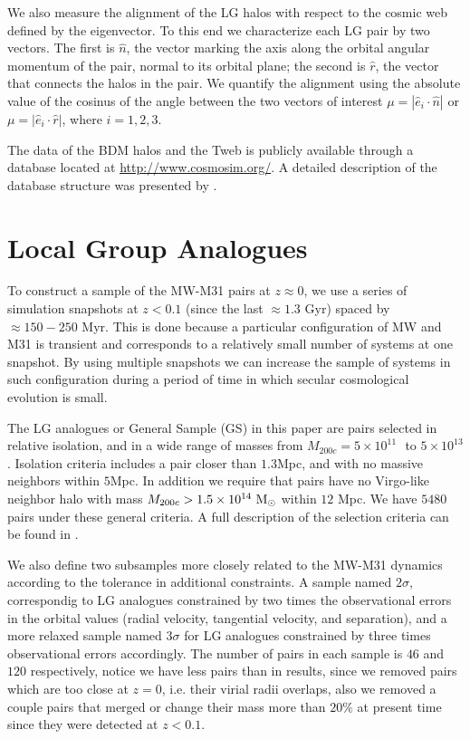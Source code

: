 \documentclass{emulateapj}
\newcommand{\mpc}{\rm{Mpc}}
\newcommand{\msun}{{\ifmmode{{\rm {M_{\odot}}}}\else{${\rm{M_{\odot}}}$}\fi}}
\begin{document}
We also measure the alignment of the LG halos with respect to the
cosmic web defined by the eigenvector.
To this end we characterize each LG pair by two vectors. 
The first is $\hat{n}$, the vector marking the axis along the orbital angular
momentum of the pair, normal to its orbital plane; the second is
$\hat{r}$, the vector that connects the halos in the pair. 
We quantify the alignment using the absolute value of the cosinus of
the angle between the two vectors of interest $\mu=|\hat{e}_i \cdot
\hat{n}|$ or $\mu=|\hat{e}_i\cdot \hat{r}|$, where $i=1,2,3$. 


The data of the BDM halos and the Tweb is publicly available through
a database located at \url{http://www.cosmosim.org/}. A detailed
description of the database structure was presented by \cite{Riebe2013}.

\section{Local Group Analogues}
\label{sec:lg_analogues}

To construct a sample of the MW-M31 pairs at $z\approx 0$, we use a
series of simulation snapshots  at $z<0.1$ (since the last $\approx
1.3$ Gyr) spaced by $\approx 150-250$ Myr. 
This is done because a particular configuration of MW and M31 is transient and
corresponds to a relatively small number of systems at one
snapshot. 
By using multiple snapshots we can increase the sample of systems in
such configuration during a period of time in which secular
cosmological evolution is small.  

The LG analogues or General Sample (GS) in this paper are pairs selected in
relative isolation, and in a wide range of masses from  $M_{200c}=5
\times 10^{11}$ \msun $ $ to $ 5 \times 10^{13}$ \msun.  
Isolation criteria includes a pair closer than $1.3$\mpc, and with no
massive neighbors within $5$\mpc.
In addition we require that pairs have no Virgo-like neighbor halo
with mass $M_{200c}>1.5 \times 10^{14}\ \rm M_{\odot}$ within $12$
Mpc.  
We have $5480$ pairs under these general criteria. 
A full description of the selection criteria can be found in
\citet{lganalogues,sat}.   

We also define two subsamples more closely related to the MW-M31 
dynamics according to the tolerance in additional constraints.
A sample named $2\sigma$, correspondig to LG analogues constrained by
two times the observational errors in the orbital values (radial
velocity, tangential velocity, and separation), and a more relaxed
sample named $3\sigma$ for LG analogues constrained by three times
observational errors accordingly. 
The number of pairs in each sample is $46$ and $120$ respectively,
notice we have less pairs than in \citet{lganalogues} results, since
we removed pairs which are too close at $z=0$, i.e. their virial radii
overlaps, also we removed a couple pairs that merged or change their
mass more than $20\%$ at present time since they were detected at
$z<0.1$. 
\end{document}

